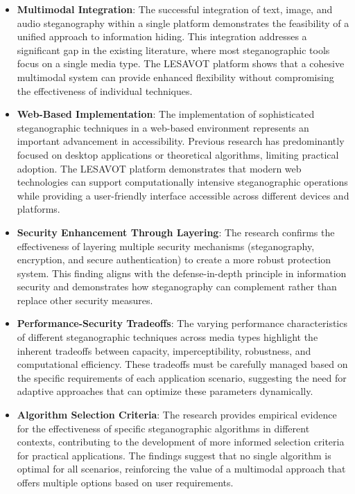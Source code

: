 \documentclass[12pt, a4paper, oneside]{book}
\begin{document}
\begin{itemize}[leftmargin=*]
    \item \textbf{Multimodal Integration}: The successful integration of text, image, and audio steganography within a single platform demonstrates the feasibility of a unified approach to information hiding. This integration addresses a significant gap in the existing literature, where most steganographic tools focus on a single media type. The LESAVOT platform shows that a cohesive multimodal system can provide enhanced flexibility without compromising the effectiveness of individual techniques.

    \item \textbf{Web-Based Implementation}: The implementation of sophisticated steganographic techniques in a web-based environment represents an important advancement in accessibility. Previous research has predominantly focused on desktop applications or theoretical algorithms, limiting practical adoption. The LESAVOT platform demonstrates that modern web technologies can support computationally intensive steganographic operations while providing a user-friendly interface accessible across different devices and platforms.

    \item \textbf{Security Enhancement Through Layering}: The research confirms the effectiveness of layering multiple security mechanisms (steganography, encryption, and secure authentication) to create a more robust protection system. This finding aligns with the defense-in-depth principle in information security and demonstrates how steganography can complement rather than replace other security measures.

    \item \textbf{Performance-Security Tradeoffs}: The varying performance characteristics of different steganographic techniques across media types highlight the inherent tradeoffs between capacity, imperceptibility, robustness, and computational efficiency. These tradeoffs must be carefully managed based on the specific requirements of each application scenario, suggesting the need for adaptive approaches that can optimize these parameters dynamically.

    \item \textbf{Algorithm Selection Criteria}: The research provides empirical evidence for the effectiveness of specific steganographic algorithms in different contexts, contributing to the development of more informed selection criteria for practical applications. The findings suggest that no single algorithm is optimal for all scenarios, reinforcing the value of a multimodal approach that offers multiple options based on user requirements.
\end{itemize}
\end{document}
